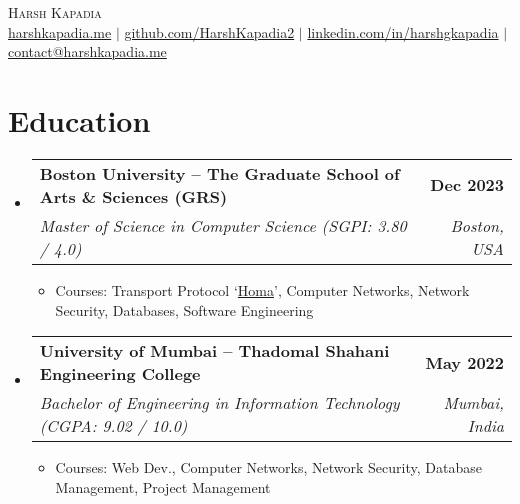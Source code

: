 \documentclass[letterpaper,11pt]{article}
\makeatletter
\newcommand{\resumeItem}[1]{
  \item\small{
    {#1 \vspace{-2pt}}
  }
}
\newcommand{\resumeSubheading}[4]{
  \vspace{-2pt}\item
    \begin{tabular*}{1.0\textwidth}[t]{l@{\extracolsep{\fill}}r}
      \vspace{-2pt}\textbf{#1} & \textbf{\small #2} \\
      \textit{\small#3} & \textit{\small #4} \\
    \end{tabular*}\vspace{-7pt}
}
\newcommand{\resumeSubHeadingListStart}{\begin{itemize}[leftmargin=0.0in, label={}]}
\newcommand{\resumeSubHeadingListEnd}{\end{itemize}}
\newcommand{\resumeItemListStart}{\begin{itemize}}
\newcommand{\resumeItemListEnd}{\end{itemize}\vspace{-5pt}}
\makeatother
\begin{document}

\begin{center}
    {\huge \scshape Harsh Kapadia} \\ \vspace{5pt}
    \small
    \href{https://harshkapadia.me}{harshkapadia.me} $|$ \href{https://github.com/HarshKapadia2}{github.com/HarshKapadia2} $|$ \href{https://linkedin.com/in/harshgkapadia}{linkedin.com/in/harshgkapadia} $|$ \href{mailto:contact@harshkapadia.me}{contact@harshkapadia.me}
    \vspace{-8pt}
\end{center}


\section{Education}
    \resumeSubHeadingListStart
        \resumeSubheading
            {Boston University -- The Graduate School of Arts \& Sciences (GRS)}{Dec 2023}
            {Master of Science in Computer Science (SGPI: 3.80 / 4.0)}{Boston, USA}
            \resumeItemListStart
                \resumeItem{Courses: Transport Protocol `\href{https://networking.harshkapadia.me/files/homa/report}{Homa}', Computer Networks, Network Security, Databases, Software Engineering}
            \resumeItemListEnd

        \resumeSubheading
            {University of Mumbai -- Thadomal Shahani Engineering College}{May 2022}
            {Bachelor of Engineering in Information Technology (CGPA: 9.02 / 10.0)}{Mumbai, India}
            \resumeItemListStart
                \resumeItem{Courses: Web Dev., Computer Networks, Network Security, Database Management, Project Management}
            \resumeItemListEnd
    \resumeSubHeadingListEnd
\vspace{-19pt}


\end{document}
